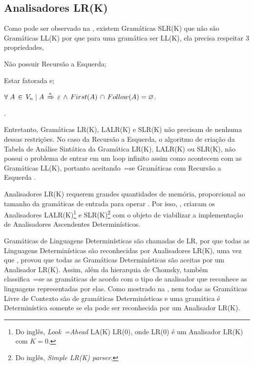 \subsection{Analisadores LR(K)}

Como pode ser observado na ,
existem Gramáticas SLR(K) que não são Gramáticas LL(K) por que para uma gramática ser LL(K),
ela precisa respeitar 3 propriedades,
\begin{inparaenum}[1)]
    \item Não possuir Recursão a Esquerda;
    \item Estar fatorada e;
    \item $\forall\; A\, \in\, V_n\; |\; A\,
            \xRightarrow{*}\, \varepsilon\,
            \land\, First(A)\, \cap\, Follow(A) = \varnothing$.
\end{inparaenum}%
\cite{ahoCompilerDragonBook}.

Entretanto,
Gramáticas LR(K), LALR(K) e
SLR(K) não precisam de nenhuma dessas restrições.
No caso da Recursão a Esquerda,
o algoritmo de criação da Tabela de Análise Sintática da Gramática LR(K),
LALR(K) ou SLR(K),
não possui o problema de entrar em um loop infinito assim como acontecem com as Gramáticas LL(K),
portanto aceitando~=se Gramáticas com Recursão a Esquerda \cite{ahoCompilerDragonBook}.

Analisadores LR(K) requerem grandes quantidades de memória,
proporcional ao tamanho da gramáticas de entrada para operar \cite{complexityOfLRKTesting}.
Por isso,
,
criaram os Analisadores LALR(K)\footnote{
Do inglês, \textit{Look~=Ahead} LA(K) LR(0),
onde LR(0) é um Analisador LR(K) com $K=0$.
}
e SLR(K)\footnote{
Do inglês, \textit{Simple LR(K) parser}.
}
com o objeto de viabilizar a implementação de Analisadores Ascendentes Determinísticos.

Gramáticas de Linguagens Determinísticas são chamadas de LR,
por que todas as Linguagens Determinísticas são reconhecidas por Analisadores LR(K),
uma vez que ,
provou que todas as Gramáticas Determinísticas são aceitas por um Analisador LR(K).
Assim,
além da hierarquia de Chomsky,
também classifica~=se as gramáticas de acordo com o tipo de analisador que reconhece as linguagens representadas por elas.
Como mostrado na ,
nem todas as Gramáticas Livre de Contexto são de gramáticas Determinísticas e
uma gramática é Determinística somente se ela pode ser reconhecida por um Analisador LR(K).


